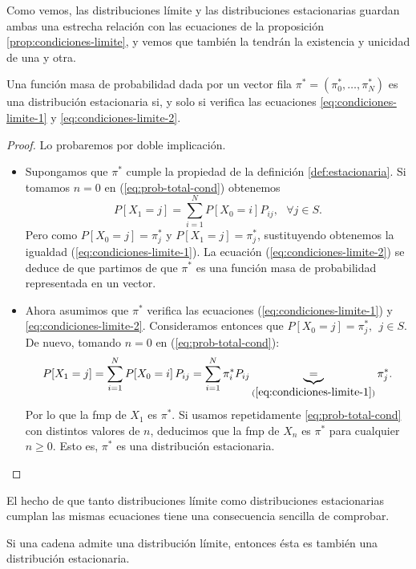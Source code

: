 Como vemos, las distribuciones límite y las distribuciones estacionarias guardan ambas una estrecha relación con las ecuaciones de la proposición \ref{prop:condiciones-limite}, y vemos que también la tendrán la existencia y unicidad de una y otra.

\begin{proposicion}
    Una función masa de probabilidad dada por un vector fila $\pi^* =(\pi_0^*,\dots,\pi_N^*)$ es una distribución estacionaria si, y solo si verifica las ecuaciones \eqref{eq:condiciones-limite-1} y \eqref{eq:condiciones-limite-2}.
\end{proposicion}
\begin{proof}
    Lo probaremos por doble implicación.
    \begin{itemize}
        \item[\fcolorbox{black}{white}{$\Rightarrow$}] Supongamos que $\pi^*$ cumple la propiedad de la definición \ref{def:estacionaria}. Si tomamos $n=0$ en (\ref{eq:prob-total-cond}) obtenemos
        $$
        P[X_{1}=j]=\sum_{i=1}^N P[X_0=i] P_{ij}, \ \ \ \forall j\in S.
        $$ 
        Pero como $P[X_0=j]=\pi_j^*$ y $P[X_{1}=j]=\pi_j^*$, sustituyendo obtenemos la igualdad (\ref{eq:condiciones-limite-1}). La ecuación (\ref{eq:condiciones-limite-2}) se deduce de que partimos de que $\pi^*$ es una función masa de probabilidad representada en un vector.
        \item[\fcolorbox{black}{white}{$\Leftarrow$}] Ahora asumimos que $\pi^*$ verifica las ecuaciones (\ref{eq:condiciones-limite-1}) y \eqref{eq:condiciones-limite-2}. Consideramos entonces que $P[X_0=j]=\pi_j^*, \ \ j\in S$. De nuevo, tomando $n=0$ en (\ref{eq:prob-total-cond}):
        $$
        P[X_{1}=j]=\sum_{i=1}^N P[X_0=i]\, P_{ij} = \sum_{i=1}^N \pi_i^* P_{ij} \underbrace{=}_{(\ref{eq:condiciones-limite-1})}\pi_j^*.
        $$
        Por lo que la fmp de $X_1$ es $\pi^*$. Si usamos repetidamente \eqref{eq:prob-total-cond} con distintos valores de $n$, deducimos que la fmp de $X_n$ es $\pi^*$ para cualquier $n\geq 0$. Esto es, $\pi^*$ es una distribución estacionaria.
    \end{itemize}
\end{proof}

El hecho de que tanto distribuciones límite como distribuciones estacionarias cumplan las mismas ecuaciones tiene una consecuencia sencilla de comprobar.

\begin{corolario}
    Si una cadena admite una distribución límite, entonces ésta es también una distribución estacionaria.
\end{corolario}

